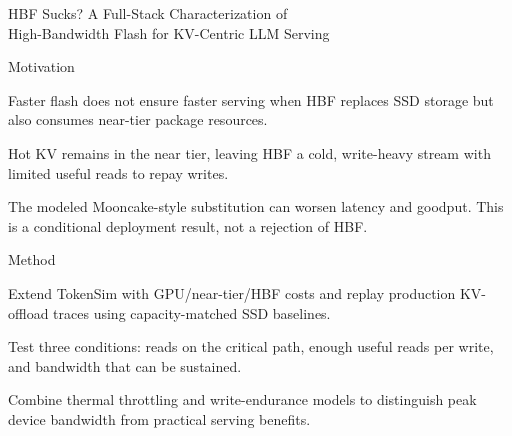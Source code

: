 \begin{frame}[t]{HBF Sucks? A Full-Stack Characterization of\\High-Bandwidth Flash for KV-Centric LLM Serving}
\vspace{.02cm}
\begin{minipage}[t][3.25cm][t]{\linewidth}
\begin{summarysection}{Motivation}
\item {} Faster flash does not ensure faster serving when HBF replaces SSD storage but also consumes near-tier package resources.
\item {} Hot KV remains in the near tier, leaving HBF a cold, write-heavy stream with limited useful reads to repay writes.
\item {} The modeled Mooncake-style substitution can worsen latency and goodput. This is a conditional deployment result, not a rejection of HBF.
\end{summarysection}
\end{minipage}
\vspace{.18cm}
\begin{summarysection}{Method}
\item {} Extend TokenSim with GPU/near-tier/HBF costs and replay production KV-offload traces using capacity-matched SSD baselines.
\item {} Test three conditions: reads on the critical path, enough useful reads per write, and bandwidth that can be sustained.
\item {} Combine thermal throttling and write-endurance models to distinguish peak device bandwidth from practical serving benefits.
\end{summarysection}
\end{frame}
